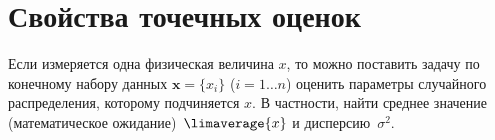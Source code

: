

\section{Свойства точечных оценок} \label{sec:point}
Если измеряется одна физическая величина $x$, то можно поставить задачу
по конечному набору данных $\mathbf{x}=\{x_i\}$ ($i=1\ldots n$) оценить параметры
случайного распределения, которому подчиняется $x$. В частности,
найти среднее значение (математическое ожидание)~$\limaverage{x}$ и
дисперсию~$\sigma^2$.


